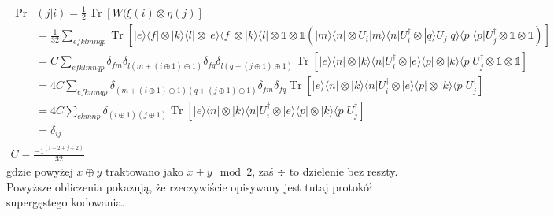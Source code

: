 \documentclass[10pt]{article} %
\DeclareMathOperator{\Trs}{Tr}
\newcommand{\Ket}[1]{|#1\rangle}
\newcommand{\Bra}[1]{\langle#1|}
\newcommand{\I}{\mathbb{1}}
\begin{document}
\begin{gather}
\begin{split}
\Pr&(j|i) = \frac{1}{2}\Trs \left[ W (\xi(i) \otimes \eta(j)\right] \\
 &= \frac{1}{32}\sum_{efklmnqp} \Trs \left[\Ket{e}\Bra{f} \otimes \Ket{k}\Bra{l} \otimes \Ket{e}\Bra{f} \otimes  \Ket{k}\Bra{l} \otimes \I \otimes \I \left( \Ket{m}\Bra{n} \otimes U_i\Ket{m}\Bra{n}U_i^\dag \otimes \Ket{q}U_j\Ket{q}\Bra{p}\Bra{p}U_j^\dag\otimes \I\otimes \I\right)\right] \\
 &= C\sum_{efklmnqp} \delta_{fm}
\delta_{l(m + (i \oplus 1) \oplus 1)}
\delta_{fq} 
\delta_{l(q + (j \oplus 1) \oplus 1)} \Trs \left [ \Ket{e}\Bra{n} \otimes \Ket{k}\Bra{n}U_i^\dag\otimes \Ket{e}\Bra{p} \otimes \Ket{k}\Bra{p}U_j^\dag \otimes \I \otimes \I\right] \\
&=4C \sum_{efkmnqp} \delta_{(m + (i \oplus 1) \oplus 1)(q + (j \oplus 1) \oplus 1)} \delta_{fm} \delta_{fq} \Trs \left [ \Ket{e}\Bra{n} \otimes \Ket{k}\Bra{n}U_i^\dag\otimes \Ket{e}\Bra{p} \otimes \Ket{k}\Bra{p}U_j^\dag \right] \\
&= 4C \sum_{ekmnp} \delta_{(i \oplus 1)(j \oplus 1)} \Trs \left [ \Ket{e}\Bra{n} \otimes \Ket{k}\Bra{n}U_i^\dag\otimes \Ket{e}\Bra{p} \otimes \Ket{k}\Bra{p}U_j^\dag \right] \\
&= \delta_{ij}
\end{split} \nonumber\\
C = \frac{-1^{(i \div 2 + j \div 2)}}{32}
\end{gather} gdzie powyżej $x \oplus y$ traktowano jako $x + y \mod 2$, zaś $\div$ to dzielenie bez reszty. Powyższe obliczenia pokazują, że rzeczywiście opisywany jest tutaj protokół supergęstego kodowania.
\end{document}
